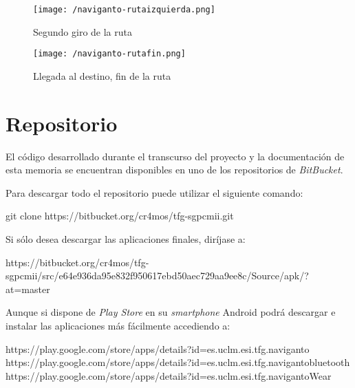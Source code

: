 \begin{figure}[!h]
  \begin{minipage}[b]{0.5\linewidth}
    \begin{center}
      \texttt{[image: /naviganto-rutaizquierda.png]}
      \caption{Segundo giro de la ruta}
      \label{fig:navigantoRutaSegundoGiro}
    \end{center}
  \end{minipage}
  \begin{minipage}[b]{0.5\linewidth}
    \begin{center}
      \texttt{[image: /naviganto-rutafin.png]}
      \caption{Llegada al destino, fin de la ruta}
      \label{fig:navigantoRutaFin}
    \end{center}
  \end{minipage}
\end{figure}

\newpage %
\section{Repositorio}

El código desarrollado durante el transcurso del proyecto y la documentación de esta memoria se
encuentran disponibles en uno de los repositorios de \emph{BitBucket}.

Para descargar todo el repositorio puede utilizar el siguiente comando:

\begin{listing}[
  float=ht,
  language = Bash]
git clone https://bitbucket.org/cr4mos/tfg-sgpcmii.git
\end{listing}

Si sólo desea descargar las aplicaciones finales, diríjase a:

\begin{listing}
https://bitbucket.org/cr4mos/tfg-sgpcmii/src/e64e936da95e832f950617ebd50aec729aa9ee8c/Source/apk/?at=master
\end{listing}

Aunque si dispone de \emph{Play Store} en su \emph{smartphone} Android podrá descargar e instalar
las aplicaciones más fácilmente accediendo a:

\begin{listing}
https://play.google.com/store/apps/details?id=es.uclm.esi.tfg.naviganto
https://play.google.com/store/apps/details?id=es.uclm.esi.tfg.navigantobluetooth
https://play.google.com/store/apps/details?id=es.uclm.esi.tfg.navigantoWear
\end{listing}

